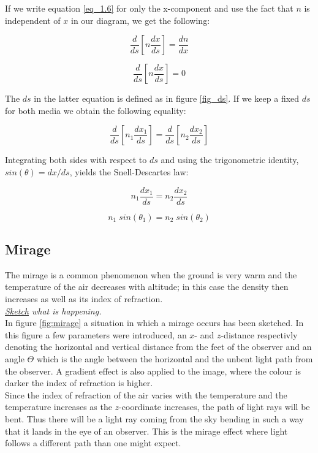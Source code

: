 \documentclass{article}
\begin{document}
If we write equation \ref{eq_1.6} for only the x-component and use the fact that $n$ is independent of $x$ in our diagram, we get the following:

\begin{equation}
	\frac{d}{ds} \left[ n \frac{d x}{ds} \right] = \frac{d n}{dx}
\end{equation}

\begin{equation}
	\frac{d}{ds} \left[ n \frac{d x}{ds} \right] = 0
\end{equation}

The $ds$ in the latter equation is defined as in figure \ref{fig_ds}. If we keep a fixed $ds$ for both media we obtain the following equality:

\begin{equation}
	\frac{d}{ds} \left[ n_1 \frac{d x_1}{ds} \right] = \frac{d}{ds} \left[ n_2 \frac{d x_2}{ds} \right]
\end{equation}

Integrating both sides with respect to $ds$ and using the trigonometric identity, $sin(\theta)= dx/ds$, yields the Snell-Descartes law:

\begin{equation}
	n_1 \frac{d x_1}{ds}=n_2 \frac{d x_2}{ds}
\end{equation}

\begin{equation}
	n_1 \; sin(\theta _1) = n_2 \; sin(\theta _2)
	\label{eq_snell}
\end{equation}

\subsection{Mirage}
The mirage is a common phenomenon when the ground is very warm and the temperature of the air decreases with altitude; in this case the density then increases as well as its index of refraction.\\
\vspace{3mm}
\textit{\underline{Sketch} what is happening.}\\
In figure \ref{fig:mirage} a situation in which a mirage occurs has been sketched. In this figure a few parameters were introduced, an $x$- and $z$-distance respectivly denoting the horizontal and vertical distance from the feet of the observer and an angle $\Theta$ which is the angle between the horizontal and the unbent light path from the observer. A gradient effect is also applied to the image, where the colour is darker the index of refraction is higher.\\
Since the index of refraction of the air varies with the temperature and the temperature increases as the $z$-coordinate increases, the path of light rays will be bent. Thus there will be a light ray coming from the sky bending in such a way that it lands in the eye of an observer. This is the mirage effect where light follows a different path than one might expect.\\
\end{document}
